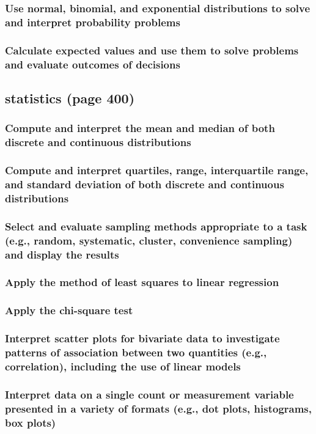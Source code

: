 \documentclass[11pt]{article}
\begin{document}
\subsubsection{Use normal, binomial, and exponential distributions to solve and interpret probability problems}
\label{sec:org5995c6a}
\subsubsection{Calculate expected values and use them to solve problems and evaluate outcomes of decisions}
\label{sec:org5246feb}
\subsection{statistics (page 400)}
\label{sec:org5fca3ae}
\subsubsection{Compute and interpret the mean and median of both discrete and continuous distributions}
\label{sec:org7707915}
\subsubsection{Compute and interpret quartiles, range, interquartile range, and standard deviation of both discrete and continuous distributions}
\label{sec:org4e6f4d5}
\subsubsection{Select and evaluate sampling methods appropriate to a task (e.g., random, systematic, cluster, convenience sampling) and display the results}
\label{sec:org788685d}
\subsubsection{Apply the method of least squares to linear regression}
\label{sec:org9c80ea9}
\subsubsection{Apply the chi-square test}
\label{sec:orge1eed26}
\subsubsection{Interpret scatter plots for bivariate data to investigate patterns of association between two quantities (e.g., correlation), including the use of linear models}
\label{sec:orgf710925}
\subsubsection{Interpret data on a single count or measurement variable presented in a variety of formats (e.g., dot plots, histograms, box plots)}
\label{sec:org6a2fe06}
\end{document}
